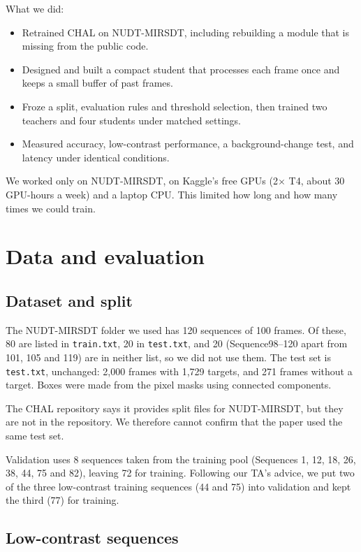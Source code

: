 \documentclass[11pt,a4paper]{article}
\begin{document}
What we did:
\begin{itemize}
  \item Retrained CHAL on NUDT-MIRSDT, including rebuilding a module that is missing from the public code.
  \item Designed and built a compact student that processes each frame once and keeps a small buffer of past
        frames.
  \item Froze a split, evaluation rules and threshold selection, then trained two teachers and four students
        under matched settings.
  \item Measured accuracy, low-contrast performance, a background-change test, and latency under identical
        conditions.
\end{itemize}

We worked only on NUDT-MIRSDT, on Kaggle's free GPUs (2$\times$ T4, about 30 GPU-hours a week) and a laptop
CPU. This limited how long and how many times we could train.

\section{Data and evaluation}

\subsection{Dataset and split}

The NUDT-MIRSDT folder we used has 120 sequences of 100 frames. Of these, 80 are listed in \texttt{train.txt},
20 in \texttt{test.txt}, and 20 (Sequence98--120 apart from 101, 105 and 119) are in neither list, so we did not
use them. The test set is \texttt{test.txt}, unchanged: 2{,}000 frames with 1{,}729 targets, and 271 frames
without a target. Boxes were made from the pixel masks using connected components.

The CHAL repository says it provides split files for NUDT-MIRSDT, but they are not in the repository. We therefore
cannot confirm that the paper used the same test set.

Validation uses 8 sequences taken from the training pool (Sequences 1, 12, 18, 26, 38, 44, 75 and 82), leaving 72
for training. Following our TA's advice, we put two of the three low-contrast training sequences (44 and 75) into
validation and kept the third (77) for training.

\subsection{Low-contrast sequences}
\end{document}
